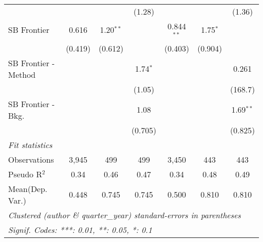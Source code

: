 \begin{tabular}{lcccccc}
                        &         &              & (1.28)      &              &            & (1.36)\\   
   SB Frontier          & 0.616   & 1.20$^{**}$  &             & 0.844$^{**}$ & 1.75$^{*}$ &   \\   
                        & (0.419) & (0.612)      &             & (0.403)      & (0.904)    &   \\   
   SB Frontier - Method &         &              & 1.74$^{*}$  &              &            & 0.261\\   
                        &         &              & (1.05)      &              &            & (168.7)\\   
   SB Frontier - Bkg.   &         &              & 1.08        &              &            & 1.69$^{**}$\\   
                        &         &              & (0.705)     &              &            & (0.825)\\   
   \midrule
   \emph{Fit statistics}\\
   Observations         & 3,945   & 499          & 499         & 3,450        & 443        & 443\\  
   Pseudo R$^2$         & 0.34    & 0.46         & 0.47        & 0.34         & 0.48       & 0.49\\  
Mean(Dep. Var.) & 0.448 & 0.745 & 0.745 & 0.500 & 0.810 & 0.810 \\
   \midrule \midrule
   \multicolumn{7}{l}{\emph{Clustered (author \& quarter\_year) standard-errors in parentheses}}\\
   \multicolumn{7}{l}{\emph{Signif. Codes: ***: 0.01, **: 0.05, *: 0.1}}\\
\end{tabular}
\par\endgroup
